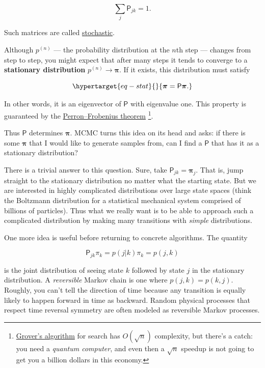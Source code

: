 \documentclass[
  letterpaper,
  DIV=11,
  numbers=noendperiod]{scrreprt}
\theoremstyle{definition}
\theoremstyle{remark}
\begin{document}
\[
\sum_j \mathsf{P}_{jk} = 1.
\]

Such matrices are called
\href{https://en.wikipedia.org/wiki/Stochastic_matrix}{stochastic}.

Although \(p^{(n)}\) --- the probability distribution at the \(n\)th
step --- changes from step to step, you might expect that after many
steps it tends to converge to a \textbf{stationary distribution}
\(p^{(n)}\to\boldsymbol{\pi}\). If it exists, this distribution must
satisfy

\begin{equation}\protect\hypertarget{eq-stat}{}{
\boldsymbol{\pi} = \mathsf{P}\boldsymbol{\pi}.
}\label{eq-stat}\end{equation}

In other words, it is an eigenvector of \(\mathsf{P}\) with eigenvalue
one. This property is guaranteed by the
\href{https://en.wikipedia.org/wiki/Perron\%E2\%80\%93Frobenius_theorem}{Perron--Frobenius
theorem} \footnote{\href{https://en.wikipedia.org/wiki/Grover\%27s_algorithm}{Grover's
  algorithm} for search has \(O(\sqrt{n})\) complexity, but there's a
  catch: you need a \emph{quantum computer}, and even then a
  \(\sqrt{n}\) speedup is not going to get you a billion dollars in this
  economy.}.

Thus \(\mathsf{P}\) determines \(\boldsymbol{\pi}\). MCMC turns this
idea on its head and asks: if there is some \(\boldsymbol{\pi}\) that I
would like to generate samples from, can I find a \(\mathsf{P}\) that
has it as a stationary distribution?

There is a trivial answer to this question. Sure, take
\(\mathsf{P}_{jk}=\boldsymbol{\pi}_j\). That is, jump straight to the
stationary distribution no matter what the starting state. But we are
interested in highly complicated distributions over large state spaces
(think the Boltzmann distribution for a statistical mechanical system
comprised of billions of particles). Thus what we really want is to be
able to approach such a complicated distribution by making many
transitions with \emph{simple} distributions.

One more idea is useful before returning to concrete algorithms. The
quantity

\[
\mathsf{P}_{jk}\pi_k = p(j|k)\pi_k = p(j,k)
\]

is the joint distribution of seeing state \(k\) followed by state \(j\)
in the stationary distribution. A \emph{reversible} Markov chain is one
where \(p(j,k)=p(k,j)\). Roughly, you can't tell the direction of time
because any transition is equally likely to happen forward in time as
backward. Random physical processes that respect time reversal symmetry
are often modeled as reversible Markov processes.
\end{document}

